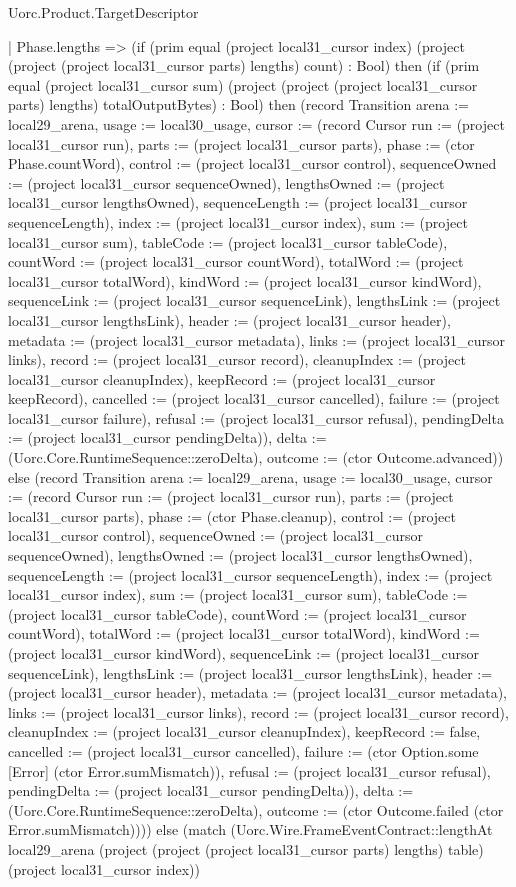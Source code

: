 \begin{lexlean}{Uorc.Product.TargetDescriptor}
\begin{semanticmodule}
{    | Phase.lengths => (if (prim equal (project local31_cursor index) (project (project (project local31_cursor parts) lengths) count) : Bool) then (if (prim equal (project local31_cursor sum) (project (project (project local31_cursor parts) lengths) totalOutputBytes) : Bool) then (record Transition {arena := local29_arena, usage := local30_usage, cursor := (record Cursor {run := (project local31_cursor run), parts := (project local31_cursor parts), phase := (ctor Phase.countWord), control := (project local31_cursor control), sequenceOwned := (project local31_cursor sequenceOwned), lengthsOwned := (project local31_cursor lengthsOwned), sequenceLength := (project local31_cursor sequenceLength), index := (project local31_cursor index), sum := (project local31_cursor sum), tableCode := (project local31_cursor tableCode), countWord := (project local31_cursor countWord), totalWord := (project local31_cursor totalWord), kindWord := (project local31_cursor kindWord), sequenceLink := (project local31_cursor sequenceLink), lengthsLink := (project local31_cursor lengthsLink), header := (project local31_cursor header), metadata := (project local31_cursor metadata), links := (project local31_cursor links), record := (project local31_cursor record), cleanupIndex := (project local31_cursor cleanupIndex), keepRecord := (project local31_cursor keepRecord), cancelled := (project local31_cursor cancelled), failure := (project local31_cursor failure), refusal := (project local31_cursor refusal), pendingDelta := (project local31_cursor pendingDelta)}), delta := (Uorc.Core.RuntimeSequence::zeroDelta), outcome := (ctor Outcome.advanced)}) else (record Transition {arena := local29_arena, usage := local30_usage, cursor := (record Cursor {run := (project local31_cursor run), parts := (project local31_cursor parts), phase := (ctor Phase.cleanup), control := (project local31_cursor control), sequenceOwned := (project local31_cursor sequenceOwned), lengthsOwned := (project local31_cursor lengthsOwned), sequenceLength := (project local31_cursor sequenceLength), index := (project local31_cursor index), sum := (project local31_cursor sum), tableCode := (project local31_cursor tableCode), countWord := (project local31_cursor countWord), totalWord := (project local31_cursor totalWord), kindWord := (project local31_cursor kindWord), sequenceLink := (project local31_cursor sequenceLink), lengthsLink := (project local31_cursor lengthsLink), header := (project local31_cursor header), metadata := (project local31_cursor metadata), links := (project local31_cursor links), record := (project local31_cursor record), cleanupIndex := (project local31_cursor cleanupIndex), keepRecord := false, cancelled := (project local31_cursor cancelled), failure := (ctor Option.some [Error] (ctor Error.sumMismatch)), refusal := (project local31_cursor refusal), pendingDelta := (project local31_cursor pendingDelta)}), delta := (Uorc.Core.RuntimeSequence::zeroDelta), outcome := (ctor Outcome.failed (ctor Error.sumMismatch))})) else (match (Uorc.Wire.FrameEventContract::lengthAt local29_arena (project (project (project local31_cursor parts) lengths) table) (project local31_cursor index))
}
\end{semanticmodule}
\end{lexlean}
